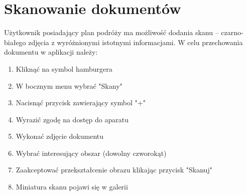 \documentclass[10pt,twoside,a4paper]{report}
\begin{document}
\section{Skanowanie dokumentów}
Użytkownik posiadający plan podróży ma możliwość dodania skanu – czarno-białego zdjęcia z wyróżnionymi istotnymi informacjami.  
W celu przechowania dokumentu w aplikacji należy:
\begin{enumerate}
\item Kliknąć na symbol hamburgera
\item W bocznym menu wybrać "Skany"
\item Nacisnąć przycisk zawierający symbol "+"
\item Wyrazić zgodę na dostęp do aparatu
\item Wykonać zdjęcie dokumentu
\item Wybrać interesujący obszar (dowolny czworokąt)
\item Zaakceptować przekształcenie obrazu klikając przycisk "Skanuj"
\item Miniatura skanu pojawi się w galerii
\end{enumerate}
 
\end{document}
